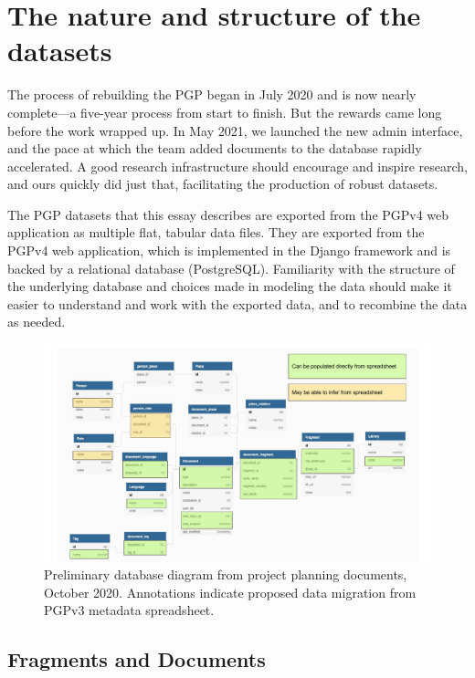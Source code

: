 \documentclass{article}
\begin{document}
\section{The nature and structure of the datasets}

The process of rebuilding the PGP began in July 2020 and is now nearly complete—a five-year process from start to finish. But the rewards came long before the work wrapped up. In May 2021, we launched the new admin interface, and the pace at which the team added documents to the database rapidly accelerated. A good research infrastructure should encourage and inspire research, and ours quickly did just that, facilitating the production of robust datasets. 


The PGP datasets that this essay describes are exported from the PGPv4 web application as multiple flat, tabular data files. They are exported from the PGPv4 web application, which is implemented in the Django framework and is backed by a relational database (PostgreSQL). Familiarity with the structure of the underlying database and choices made in modeling the data should make it easier to understand and work with the exported data, and to recombine the data as needed. 

\begin{figure}[!ht]
  \includegraphics[width=\textwidth]{db-diagrams/pgpv4_dbdiagram_import.pdf}
  \centering
  \caption{Preliminary database diagram from project planning documents, October 2020. Annotations indicate proposed data migration from PGPv3 metadata spreadsheet.}
  \label{fig:pgpv4_dbdiagram}
\end{figure}


\subsection{Fragments and Documents}
\end{document}
